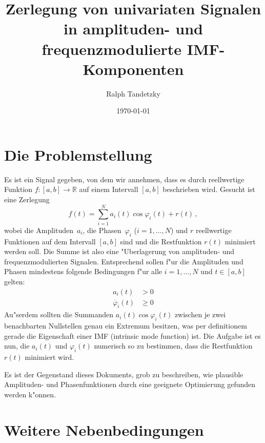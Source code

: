 \documentclass[a4paper]{scrartcl}
\newcommand{\R}{{\mathbb{R}}}
\newcommand{\pphi}{{\varphi}}
\begin{document}

\title{Zerlegung von univariaten Signalen in amplituden- und frequenzmodulierte IMF-Komponenten}
\author{Ralph Tandetzky}
\date{\today}
\maketitle


\section{Die Problemstellung}

Es ist ein Signal gegeben, von dem wir annehmen, dass es durch reellwertige Funktion $f:[a,b]\to\R$ auf einem Intervall $[a,b]$ beschrieben wird. 
Gesucht ist eine Zerlegung
$$ f(t) = \sum_{i=1}^N a_i(t)\cos\pphi_i(t) + r(t)\,, $$
wobei die Amplituden~$a_i$, die Phasen~$\pphi_i$ ($i=1,\dotsc,N$) und $r$ reellwertige Funktionen auf dem Intervall $[a,b]$ sind und die Restfunktion $r(t)$ minimiert werden soll. 
Die Summe ist also eine "Uberlagerung von amplituden- und frequenzmodulierten Signalen. 
Entsprechend sollen f"ur die Amplituden und Phasen mindestens folgende Bedingungen f"ur alle $i=1,\dotsc,N$ und $t\in[a,b]$ gelten:
\begin{align*}
  a_i(t) &> 0 \\
  \dot{\pphi_i}(t) &\ge 0
\end{align*}
Au"serdem sollten die Summanden $a_i(t)\cos\pphi_i(t)$ zwischen je zwei benachbarten Nullstellen genau ein Extremum besitzen, was per definitionem gerade die Eigenschaft einer IMF (intrinsic mode function) ist. 
Die Aufgabe ist es nun, die $a_i(t)$ und $\pphi_i(t)$ numerisch so zu bestimmen, dass die Restfunktion $r(t)$ minimiert wird. 

Es ist der Gegenstand dieses Dokuments, grob zu beschreiben, wie plausible Amplituden- und Phasenfunktionen durch eine geeignete Optimierung gefunden werden k"onnen. 

\section{Weitere Nebenbedingungen}
\end{document}
